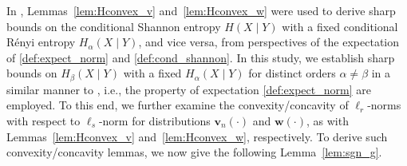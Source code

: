 \documentclass[conference, draftcls, onecolumn]{IEEEtran}
\theoremstyle{plain}
\newcommand{\bvec}[1]{\boldsymbol{#1}}
\newcommand{\lemref}[1]{Lemma~\ref{#1}}
\begin{document}
In \cite{part2}, Lemmas~\ref{lem:Hconvex_v} and~\ref{lem:Hconvex_w} were used to derive sharp bounds on the conditional Shannon entropy $H(X \mid Y)$ with a fixed conditional R\'{e}nyi entropy $H_{\alpha}(X \mid Y)$, and vice versa, from perspectives of the expectation of \eqref{def:expect_norm} and \eqref{def:cond_shannon}.
In this study, we establish sharp bounds on $H_{\beta}(X \mid Y)$ with a fixed $H_{\alpha}(X \mid Y)$ for distinct orders $\alpha \neq \beta$ in a similar manner to \cite{part2}, i.e., the property of expectation \eqref{def:expect_norm} are employed.
To this end, we further examine the convexity/concavity of $\ell_{r}$-norms with respect to $\ell_{s}$-norm for distributions $\bvec{v}_{n}( \cdot )$ and $\bvec{w}( \cdot )$, as with Lemmas~\ref{lem:Hconvex_v} and~\ref{lem:Hconvex_w}, respectively.
To derive such convexity/concavity lemmas, we now give the following \lemref{lem:sgn_g}.
\end{document}

